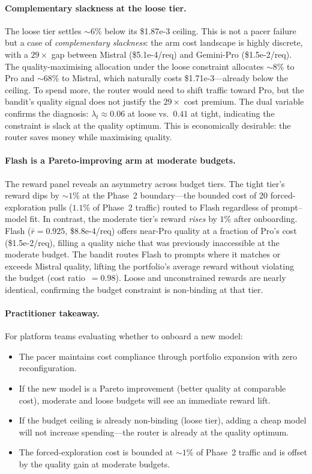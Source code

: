 \paragraph{Complementary slackness at the loose tier.}
The loose tier settles ${\sim}6$\% below its \$1.87e-3 ceiling.
This is not a pacer failure but a case of \emph{complementary
slackness}: the arm cost landscape is highly discrete, with a
$29\times$ gap between Mistral (\$5.1e-4/req) and Gemini-Pro
(\$1.5e-2/req).
The quality-maximising allocation under the loose constraint
allocates ${\sim}8$\% to Pro and ${\sim}68$\% to Mistral, which
naturally costs \$1.71e-3---already below the ceiling.
To spend more, the router would need to shift traffic toward Pro,
but the bandit's quality signal does not justify the $29\times$
cost premium.
The dual variable confirms the diagnosis: $\lambda_t \approx 0.06$
at loose vs.\ $0.41$ at tight, indicating the constraint is slack
at the quality optimum.
This is economically desirable: the router saves money while
maximising quality.

\paragraph{Flash is a Pareto-improving arm at moderate budgets.}
The reward panel reveals an asymmetry across budget tiers.
The tight tier's reward dips by ${\sim}1$\% at the Phase~2
boundary---the bounded cost of 20 forced-exploration pulls
($1.1$\% of Phase~2 traffic) routed to Flash regardless of
prompt--model fit.
In contrast, the moderate tier's reward \emph{rises} by $1$\%
after onboarding.
Flash ($\bar{r}{=}0.925$, \$8.8e-4/req) offers near-Pro quality
at a fraction of Pro's cost (\$1.5e-2/req), filling a quality
niche that was previously inaccessible at the moderate budget.
The bandit routes Flash to prompts where it matches or exceeds
Mistral quality, lifting the portfolio's average reward without
violating the budget (cost ratio~$= 0.98$).
Loose and unconstrained rewards are nearly identical, confirming
the budget constraint is non-binding at that tier.

\paragraph{Practitioner takeaway.}
For platform teams evaluating whether to onboard a new model:
\begin{itemize}[nosep,leftmargin=*]
  \item The pacer maintains cost compliance through portfolio
    expansion with zero reconfiguration.
  \item If the new model is a Pareto improvement (better quality
    at comparable cost), moderate and loose budgets will see an
    immediate reward lift.
  \item If the budget ceiling is already non-binding (loose tier),
    adding a cheap model will not increase spending---the router
    is already at the quality optimum.
  \item The forced-exploration cost is bounded at ${\sim}1$\% of
    Phase~2 traffic and is offset by the quality gain at
    moderate budgets.
\end{itemize}

